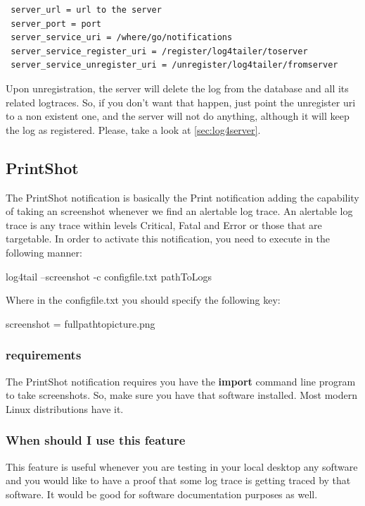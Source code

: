 \begin{config}
\begin{verbatim}
 server_url = url to the server
 server_port = port
 server_service_uri = /where/go/notifications
 server_service_register_uri = /register/log4tailer/toserver
 server_service_unregister_uri = /unregister/log4tailer/fromserver
\end{verbatim}
\end{config}

Upon unregistration, the server will delete the log from the database and all its related 
logtraces. So, if you don't want that happen, just point the unregister uri to a non existent one, 
and the server will not do anything, although it will keep the log as registered. Please, take a 
look at \autoref{sec:log4server}.

\subsection{PrintShot}
\label{sec:PrintShot}
The PrintShot notification is basically the Print notification adding the
capability of taking an screenshot whenever we find an alertable log trace. An
alertable log trace is any trace within levels Critical, Fatal and Error or
those that are targetable. In order to activate this notification, you need to
execute \logftailer{} in the following manner:

\begin{cmd}
 log4tail --screenshot -c configfile.txt pathToLogs
\end{cmd}

Where in the configfile.txt you should specify the following key:

\begin{config}
screenshot = fullpathtopicture.png
\end{config}

\subsubsection{requirements}
The PrintShot notification requires you have the \textbf{import} command line
program to take screenshots. So, make sure you have that software installed.
Most modern Linux distributions have it. 

\subsubsection{When should I use this feature}
This feature is useful whenever you are testing in your local desktop any
software and you would like to have a proof that some log trace is getting
traced by that software. It would be good for software documentation purposes
as well. 


